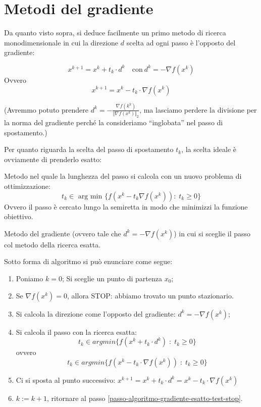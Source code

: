 \section{Metodi del gradiente} Da quanto visto sopra, si deduce
facilmente un primo metodo di ricerca monodimensionale in cui la
direzione $d$ scelta ad ogni passo \`e l'opposto del gradiente:

$$ x^{k+1} = x^{k} + t_k \cdot d^k \quad \text{con} ~ d^{k} = - \nabla f(x^{k})$$
Ovvero
$$ x^{k+1} = x^{k} - t_k \cdot \nabla f(x^{k})$$

(Avremmo potuto prendere $d^k = - \frac{\nabla f(k^k)}{\Vert \nabla
f(x^k)\Vert_{2}}$, ma lasciamo perdere la divisione per la norma del
gradiente perch\'e la consideriamo ``inglobata'' nel passo di
spostamento.)

Per quanto riguarda la scelta del passo di spostamento $t_k$, la
scelta ideale \`e ovviamente di prenderlo esatto:
\begin{defn} Metodo nel quale la
lunghezza del passo si calcola con un nuovo problema di
ottimizzazione:
$$ t_k \in \text{ arg min } \{f(x^{k} - t_k \nabla f(x^{k})): \; t_k \geq 0 \}$$
Ovvero il passo \`e cercato lungo la semiretta in modo che minimizzi la
funzione obiettivo.
\end{defn}

\begin{defn}
\label{def:metodo-gradiente-esatto} Metodo del gradiente (ovvero tale
che $d^{k} = - \nabla f(x^{k})$) in cui si sceglie il passo col metodo
della ricerca esatta.

Sotto forma di algoritmo si può enunciare come segue:
\begin{enumerate}
 \item Poniamo $k=0$; Si sceglie un punto di partenza $x_0$;
 \item Se $\nabla f(x^{k})=0$, allora STOP: abbiamo trovato un punto
stazionario. \label{passo-algoritmo-gradiente-esatto-test-stop}
\item Si calcola la direzione come l'opposto del gradiente: $ d^k = - \nabla
 f(x^{k})$;\label{passo-algoritmo-gradiente-esatto-scelta-direzione}
 \item \label{passo-algoritmo-gradiente-esatto-scelta-passo}Si calcola
il passo con la ricerca esatta:
$$t_k \in argmin \{ f(x^{k} + t_k
\cdot d^k) \; : \; t_k \geq 0 \}$$
ovvero
$$t_k \in argmin \{ f(x^{k} - t_k
\cdot \nabla f(x^{k})) \; : \; t_k \geq 0 \}$$
 \item Ci si sposta al punto successivo: $x^{k+1} =x^{k} + t_k \cdot d^k = x^{k} - t_k \cdot
\nabla f(x^{k})$
 \item $k:=k+1$, ritornare al passo
\ref{passo-algoritmo-gradiente-esatto-test-stop}.
\end{enumerate}
\end{defn}

